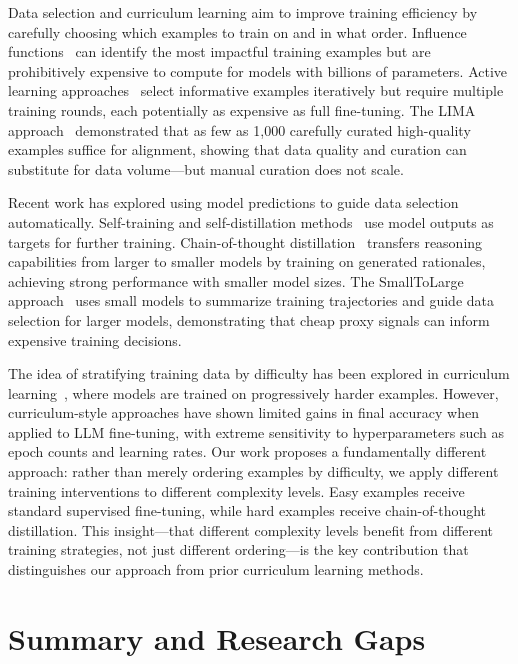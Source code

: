 Data selection and curriculum learning aim to improve training efficiency by carefully choosing which examples to train on and in what order. Influence functions~\cite{koh2017understanding} can identify the most impactful training examples but are prohibitively expensive to compute for models with billions of parameters. Active learning approaches~\cite{settles2009active} select informative examples iteratively but require multiple training rounds, each potentially as expensive as full fine-tuning. The LIMA approach~\cite{zhou2023lima} demonstrated that as few as 1,000 carefully curated high-quality examples suffice for alignment, showing that data quality and curation can substitute for data volume---but manual curation does not scale.

Recent work has explored using model predictions to guide data selection automatically. Self-training and self-distillation methods~\cite{furlanello2018born,xie2020self} use model outputs as targets for further training. Chain-of-thought distillation~\cite{ho2023large,magister2023teaching,hsieh2023distilling} transfers reasoning capabilities from larger to smaller models by training on generated rationales, achieving strong performance with smaller model sizes. The SmallToLarge approach~\cite{kim2024strategic} uses small models to summarize training trajectories and guide data selection for larger models, demonstrating that cheap proxy signals can inform expensive training decisions.

The idea of stratifying training data by difficulty has been explored in curriculum learning~\cite{bengio2009curriculum,kim2024strategic}, where models are trained on progressively harder examples. However, curriculum-style approaches have shown limited gains in final accuracy when applied to LLM fine-tuning, with extreme sensitivity to hyperparameters such as epoch counts and learning rates. Our work proposes a fundamentally different approach: rather than merely ordering examples by difficulty, we apply different training interventions to different complexity levels. Easy examples receive standard supervised fine-tuning, while hard examples receive chain-of-thought distillation. This insight---that different complexity levels benefit from different training strategies, not just different ordering---is the key contribution that distinguishes our approach from prior curriculum learning methods.

\section{Summary and Research Gaps}

